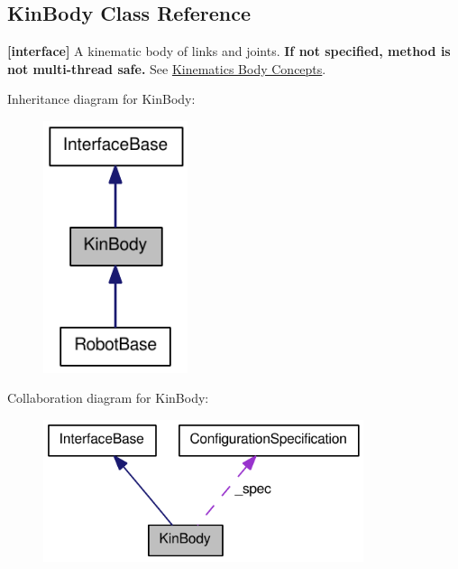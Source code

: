 \hypertarget{classOpenRAVE_1_1KinBody}{
\subsection{KinBody Class Reference}
\label{classOpenRAVE_1_1KinBody}
}


{\bfseries \mbox{[}interface\mbox{]}} A kinematic body of links and joints. {\bfseries If not specified, method is not multi-\/thread safe.} See \hyperlink{arch__kinbody}{Kinematics Body Concepts}.  




Inheritance diagram for KinBody:\nopagebreak
\begin{figure}[H]
\begin{center}
\leavevmode
\includegraphics[width=120pt]{classOpenRAVE_1_1KinBody__inherit__graph}
\end{center}
\end{figure}


Collaboration diagram for KinBody:\nopagebreak
\begin{figure}[H]
\begin{center}
\leavevmode
\includegraphics[width=266pt]{classOpenRAVE_1_1KinBody__coll__graph}
\end{center}
\end{figure}

